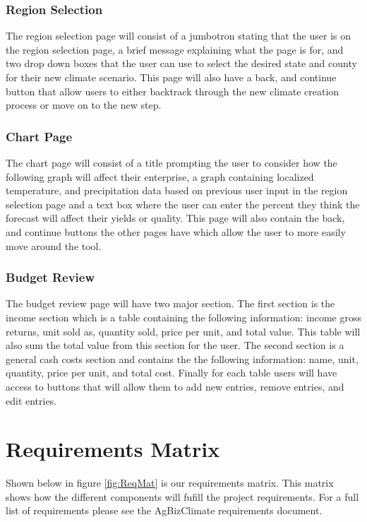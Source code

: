\documentclass[onecolumn, draftclsnofoot,10pt, compsoc]{article}
\begin{document}
		\subsubsection{Region Selection}
		The region selection page will consist of a jumbotron stating that the user is on the region selection page, a brief message explaining what the page is for, and two drop down boxes that the user can use to select the desired state and county for their new climate scenario. This page will also have a back, and continue button that allow users to either backtrack through the new climate creation process or move on to the new step.
		\subsubsection{Chart Page}
		The chart page will consist of a title prompting the user to consider how the following graph will affect their enterprise, a graph containing localized temperature, and precipitation data based on previous user input in the region selection page and a text box where the user can enter the percent they think the forecast will affect their yields or quality. This page will also contain the back, and continue buttons the other pages have which allow the user to more easily move around the tool. 
		\subsubsection{Budget Review}
		The budget review page will have two major section. The first section is the income section which is a table containing the following information: income gross returns, unit sold as, quantity sold, price per unit, and total value. This table will also sum the total value from this section for the user. The second section is a general cash costs section and contains the the following information: name, unit, quantity, price per unit, and total cost. Finally for each table users will have access to buttons that will allow them to add new entries, remove entries, and edit entries. 


\clearpage
\section{Requirements Matrix}
	Shown below in figure \ref{fig:ReqMat} is our requirements matrix. This matrix shows how the different components will fufill the project requirements. For a full list of requirements please see the AgBizClimate requirements document.\\
\end{document}
